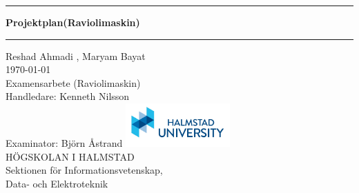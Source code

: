 \documentclass[11pt,a4paper,oneside]{book}
\begin{document}
\pagestyle{empty}

\frontmatter

\begin{titlepage}
  \begin{center}
  \end{center}
  \vspace{3cm}
  \begin{center}
    \hrule \vspace{0.5cm}
    {\Huge \bfseries \sffamily \color{hhblue} Projektplan(Raviolimaskin)}\\
    \vspace{0.8cm} \hrule \vspace{2cm} {\Large{Reshad Ahmadi , Maryam Bayat}}\\
    \vspace{2cm}
    \today\\
    \vspace{3cm}
    Examensarbete (Raviolimaskin)\\
    \vspace{1.5cm}
    Handledare: Kenneth Nilsson\\
    \vspace{0.5cm} Examinator: Björn Åstrand \vfill
    \includegraphics[width=4cm]{images/hh_logo.jpg}\\
    HÖGSKOLAN I HALMSTAD\\
    Sektionen för Informationsvetenskap, \\
    Data- och Elektroteknik
  \end{center}
\end{titlepage}
\end{document}
